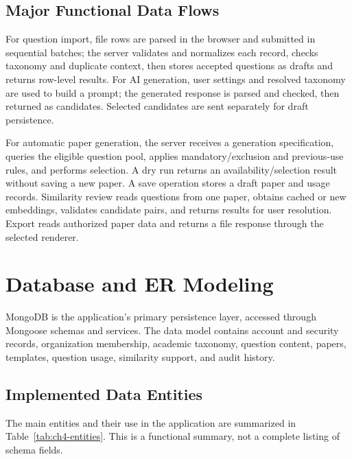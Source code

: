 \subsection{Major Functional Data Flows}

For question import, file rows are parsed in the browser and submitted in sequential batches; the server validates and normalizes each record, checks taxonomy and duplicate context, then stores accepted questions as drafts and returns row-level results. For AI generation, user settings and resolved taxonomy are used to build a prompt; the generated response is parsed and checked, then returned as candidates. Selected candidates are sent separately for draft persistence.

For automatic paper generation, the server receives a generation specification, queries the eligible question pool, applies mandatory/exclusion and previous-use rules, and performs selection. A dry run returns an availability/selection result without saving a new paper. A save operation stores a draft paper and usage records. Similarity review reads questions from one paper, obtains cached or new embeddings, validates candidate pairs, and returns results for user resolution. Export reads authorized paper data and returns a file response through the selected renderer.

\section{Database and ER Modeling}

MongoDB is the application's primary persistence layer, accessed through Mongoose schemas and services. The data model contains account and security records, organization membership, academic taxonomy, question content, papers, templates, question usage, similarity support, and audit history.

\subsection{Implemented Data Entities}

The main entities and their use in the application are summarized in Table~\ref{tab:ch4-entities}. This is a functional summary, not a complete listing of schema fields.

